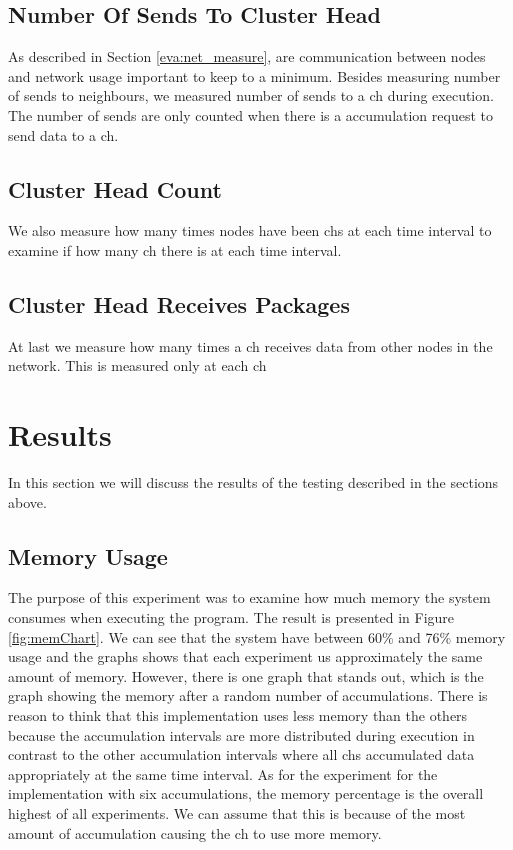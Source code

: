\documentclass[USenglish]{uit-thesis}
\begin{document}
\subsection{Number Of Sends To Cluster Head} \label{eva:num_sends_ch}
As described in Section \ref{eva:net_measure}, are communication between nodes and network usage important to keep to a minimum. Besides measuring number of sends to neighbours, we measured number of sends to a \gls{ch} during execution. The number of sends are only counted when there is a accumulation request to send data to a \gls{ch}.


\subsection{Cluster Head Count} \label{eva:ch_count}
We also measure how many times nodes have been \gls{ch}s at each time interval to examine if how many \gls{ch} there is at each time interval.

\subsection{Cluster Head Receives Packages} \label{eva:ch_recv}
At last we measure how many times a \gls{ch} receives data from other nodes in the network. This is measured only at each \gls{ch}

\newpage

\section{Results}

In this section we will discuss the results of the testing described in the sections above.

\subsection{Memory Usage}

The purpose of this experiment was to examine how much memory the system consumes when executing the program. The result is presented in Figure \ref{fig:memChart}. We can see that the system have between 60\% and 76\% memory usage and the graphs shows that each experiment us approximately the same amount of memory. However, there is one graph that stands out, which is the graph showing the memory after a random number of accumulations.
There is reason to think that this implementation uses less memory than the others because the accumulation intervals are more distributed during execution in contrast to the other accumulation intervals where all \gls{ch}s accumulated data appropriately at the same time interval. As for the experiment for the implementation with six accumulations, the memory percentage is the overall highest of all experiments. We can assume that this is because of the most amount of accumulation causing the \gls{ch} to use more memory.
\end{document}
